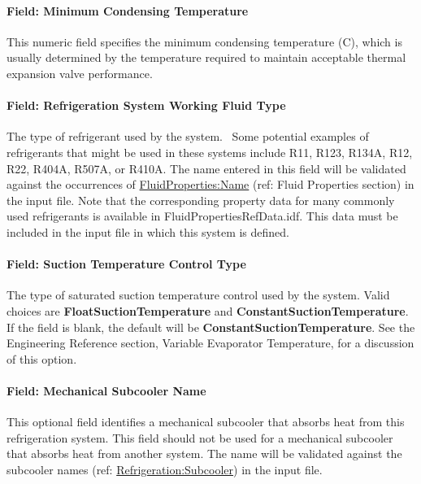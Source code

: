 \paragraph{Field: Minimum Condensing Temperature}\label{field-minimum-condensing-temperature}

This numeric field specifies the minimum condensing temperature (C), which is usually determined by the temperature required to maintain acceptable thermal expansion valve performance.

\paragraph{Field: Refrigeration System Working Fluid Type}\label{field-refrigeration-system-working-fluid-type}

The type of refrigerant used by the system.~ Some potential examples of refrigerants that might be used in these systems include R11, R123, R134A, R12, R22, R404A, R507A, or R410A. The name entered in this field will be validated against the occurrences of \hyperref[fluidpropertiesname] {FluidProperties:Name} (ref: Fluid Properties section) in the input file. Note that the corresponding property data for many commonly used refrigerants is available in FluidPropertiesRefData.idf. This data must be included in the input file in which this system is defined.

\paragraph{Field: Suction Temperature Control Type}\label{field-suction-temperature-control-type}

The type of saturated suction temperature control used by the system. Valid choices are \textbf{FloatSuctionTemperature} and \textbf{ConstantSuctionTemperature}.~ If the field is blank, the default will be \textbf{ConstantSuctionTemperature}. See the Engineering Reference section, Variable Evaporator Temperature, for a discussion of this option.

\paragraph{Field: Mechanical Subcooler Name}\label{field-mechanical-subcooler-name}

This optional field identifies a mechanical subcooler that absorbs heat from this refrigeration system. This field should not be used for a mechanical subcooler that absorbs heat from another system. The name will be validated against the subcooler names (ref: \hyperref[refrigerationsubcooler]{Refrigeration:Subcooler}) in the input file.

